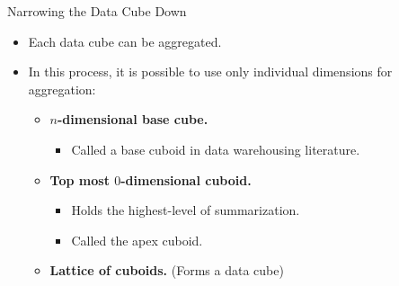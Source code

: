 \begin{frame}{Narrowing the Data Cube Down}
	\begin{itemize}
		\item Each data cube can be aggregated.
		\item In this process, it is possible to use only individual dimensions for aggregation:
		      \begin{itemize}
			      \item \textbf{$n$-dimensional base cube.}
			            \begin{itemize}
				            \item Called a base cuboid in data warehousing literature.
			            \end{itemize}
			      \item \textbf{Top most $0$-dimensional cuboid.}
			            \begin{itemize}
				            \item Holds the highest-level of summarization.
				            \item Called the apex cuboid.
			            \end{itemize}
			      \item \textbf{Lattice of cuboids.} (Forms a data cube)
		      \end{itemize}
	\end{itemize}
\end{frame}

